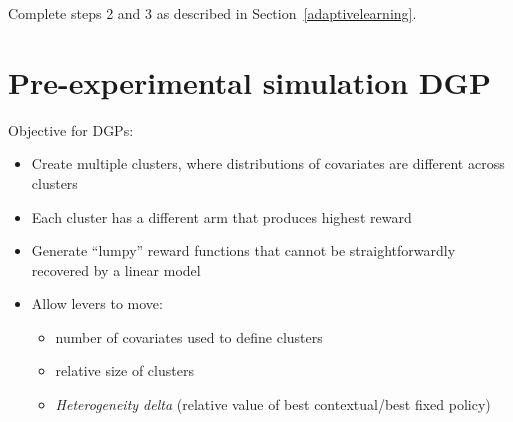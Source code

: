 \documentclass[letterpaper, 12pt, parskip=full,DIV=10]{scrartcl}
\begin{document}
\begin{enumerate}
\end{enumerate}

Complete steps 2 and 3 as described in Section~\ref{adaptivelearning}. 



\section{Pre-experimental simulation DGP}\label{appendix:dgp}

Objective for DGPs:
\begin{itemize}
    \item Create multiple clusters, where distributions of covariates are different across clusters
    \item Each cluster has a different arm that produces highest reward
    \item Generate ``lumpy'' reward functions that cannot be straightforwardly recovered by a linear model
    \item Allow levers to move:
    \begin{itemize}
        \item number of covariates used to define clusters
        \item relative size of clusters
        \item \textit{Heterogeneity delta} (relative value of best contextual/best fixed policy)
    \end{itemize} 
\end{itemize}
\end{document}
